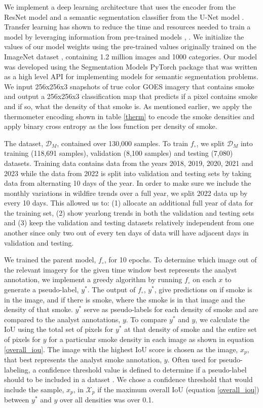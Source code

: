 \documentclass{article}
\begin{document}
We implement a deep learning architecture that uses the encoder from the ResNet model \cite{resnet} and a semantic segmentation classifier from the U-Net model \cite{unet}. Transfer learning has shown to reduce the time and resources needed to train a model by leveraging information from pre-trained models \cite{transfer}, \cite{transfer2}. We initialize the values of our model weights using the pre-trained values originally trained on the ImageNet dataset \cite{imgnet}, containing 1.2 million images and 1000 categories. Our model was developed using the Segmentation Models PyTorch package \cite{semantic} that was written as a high level API for implementing models for semantic segmentation problems. We input 256x256x3 snapshots of true color GOES imagery that contains smoke and output a 256x256x3 classification map that predicts if a pixel contains smoke and if so, what the density of that smoke is. As mentioned earlier, we apply the thermometer encoding shown in table \ref{therm} to encode the smoke densities and apply binary cross entropy as the loss function per density of smoke. 

The dataset, \(\mathcal{D}_M\), contained over 130,000 samples. To train \(f_{\circ}\), we split \(\mathcal{D}_M\) into training (118,691 samples), validation (8,100 samples) and testing (7,080) datasets. Training data contains data from the years 2018, 2019, 2020, 2021 and 2023 while the data from 2022 is split into validation and testing sets by taking data from alternating 10 days of the year. In order to make sure we include the monthly variations in wildfire trends over a full year, we split 2022 data up by every 10 days. This allowed us to: (1) allocate an additional full year of data for the training set, (2) show yearlong trends in both the validation and testing sets and (3) keep the validation and testing datasets relatively independent from one another since only two out of every ten days of data will have adjacent days in validation and testing.

We trained the parent model, \(f_{\circ}\), for 10 epochs. To determine which image out of the relevant imagery for the given time window best represents the analyst annotation, we implement a greedy algorithm by running \(f_{\circ}\) on each \(x\) to generate a pseudo-label, \(y^*\). The output of \(f_{\circ}\), \(y^*\), give predictions on if smoke is in the image, and if there is smoke, where the smoke is in that image and the density of that smoke. \(y^*\) serve as pseudo-labels for each density of smoke and are compared to the analyst annotations, \(y\). To compare \(y^*\) and \(y\), we calculate the IoU using the total set of pixels for \(y^*\) at that density of smoke and the entire set of pixels for \(y\) for a particular smoke density in each image as shown in equation \ref{overall_iou}. The image with the highest IoU score is chosen as the image, \(x_p\), that best represents the analyst smoke annotation, \(y\). Often used for pseudo-labeling, a confidence threshold value is defined to determine if a pseudo-label should to be included in a dataset \cite{conf_thresh}. We chose a confidence threshold that would include the sample, \(x_p\), in \(\mathcal{X}_{p}\) if the maximum overall IoU (equation \ref{overall_iou}) between \(y^*\) and \(y\) over all densities was over 0.1. 
\end{document}

